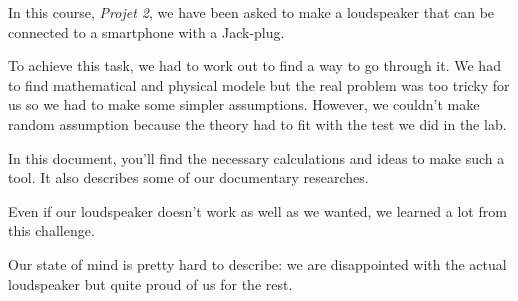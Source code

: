 

\begin{abstract-en}

In this course, \textit{Projet 2}, we have been asked to make a loudspeaker that can be connected to a smartphone with a Jack-plug.

To achieve this task, we had to work out to find a way to go through it.
We had to find mathematical and physical modele but the real problem was too tricky for us so we had to make some simpler assumptions.
However, we couldn't make random assumption because the theory had to fit with the test we did in the lab.

In this document, you'll find the necessary calculations and ideas to make such a tool. It also describes some
of our documentary researches.

Even if our loudspeaker doesn't work as well as we wanted, we learned a lot from this challenge. 

Our state of mind is pretty hard to describe: we are disappointed with the actual loudspeaker but quite proud of us for the rest.

\end{abstract-en}


